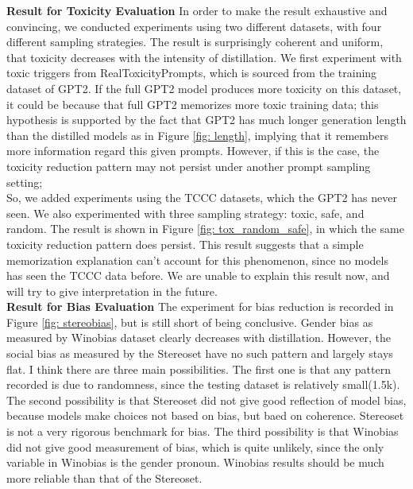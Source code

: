 
\noindent \textbf{Result for Toxicity Evaluation} \quad In order to make the result exhaustive and convincing, we conducted experiments using two different datasets, with four different sampling strategies. The result is surprisingly coherent and uniform, that toxicity decreases with the intensity of distillation. We first experiment with toxic triggers from RealToxicityPrompts, which is sourced from the training dataset of GPT2. If the full GPT2 model produces more toxicity on this dataset, it could be because that full GPT2 memorizes more toxic training data; this hypothesis is supported by the fact that GPT2 has much longer generation length than the distilled models as in Figure \ref{fig: length}, implying that it remembers more information regard this given prompts. However, if this is the case, the toxicity reduction pattern may not persist under another prompt sampling setting;\\

So, we added experiments using the TCCC datasets, which the GPT2 has never seen. We also experimented with three sampling strategy: toxic, safe, and random. The result is shown in Figure \ref{fig: tox_random_safe}, in which the same toxicity reduction pattern does persist. This result suggests that a simple memorization explanation can't account for this phenomenon, since no models has seen the TCCC data before. We are unable to explain this result now, and will try to give interpretation in the future.\\ 

\noindent \textbf{Result for Bias Evaluation} \quad The experiment for bias reduction is recorded in Figure \ref{fig: stereobias}, but is still short of being conclusive. Gender bias as measured by Winobias dataset clearly decreases with distillation. However, the social bias as measured by the Stereoset have no such pattern and largely stays flat. I think there are three main possibilities. The first one is that any pattern recorded is due to randomness, since the testing dataset is relatively small(1.5k). The second possibility is that Stereoset did not give good reflection of model bias, because models make choices not based on bias, but baed on coherence. Stereoset is not a very rigorous benchmark for bias. The third possibility is that Winobias did not give good measurement of bias, which is quite unlikely, since the only variable in Winobias is the gender pronoun. Winobias results should be much more reliable than that of the Stereoset. \\

